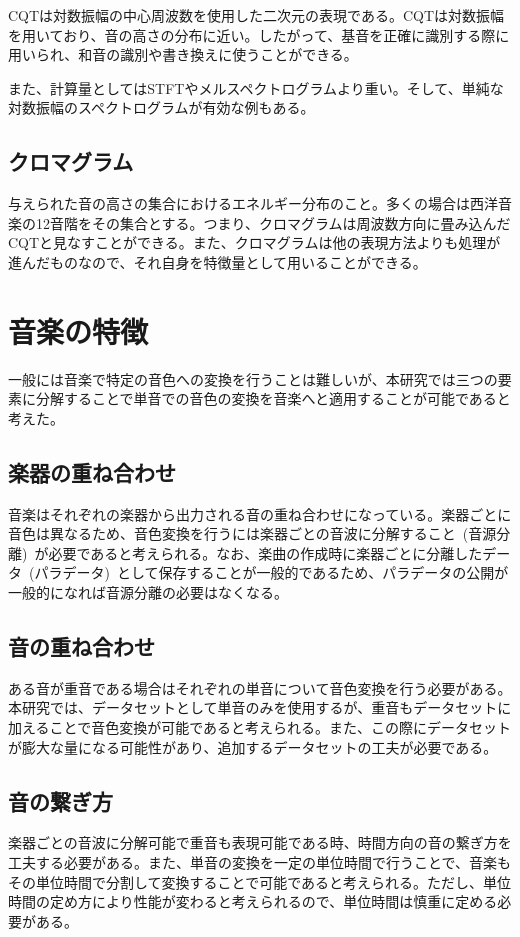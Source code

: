 CQTは対数振幅の中心周波数を使用した二次元の表現である。CQTは対数振幅を用いており、音の高さの分布に近い。したがって、基音を正確に識別する際に用いられ、和音の識別や書き換えに使うことができる。

また、計算量としてはSTFTやメルスペクトログラムより重い。そして、単純な対数振幅のスペクトログラムが有効な例もある。

\subsection{クロマグラム}

与えられた音の高さの集合におけるエネルギー分布のこと。多くの場合は西洋音楽の12音階をその集合とする。つまり、クロマグラムは周波数方向に畳み込んだCQTと見なすことができる。また、クロマグラムは他の表現方法よりも処理が進んだものなので、それ自身を特徴量として用いることができる。






\section{音楽の特徴}

一般には音楽で特定の音色への変換を行うことは難しいが、本研究では三つの要素に分解することで単音での音色の変換を音楽へと適用することが可能であると考えた。

\subsection{楽器の重ね合わせ}
    
音楽はそれぞれの楽器から出力される音の重ね合わせになっている。楽器ごとに音色は異なるため、音色変換を行うには楽器ごとの音波に分解すること~(音源分離)~が必要であると考えられる。なお、楽曲の作成時に楽器ごとに分離したデータ~(パラデータ)~として保存することが一般的であるため、パラデータの公開が一般的になれば音源分離の必要はなくなる。

\subsection{音の重ね合わせ}

ある音が重音である場合はそれぞれの単音について音色変換を行う必要がある。本研究では、データセットとして単音のみを使用するが、重音もデータセットに加えることで音色変換が可能であると考えられる。また、この際にデータセットが膨大な量になる可能性があり、追加するデータセットの工夫が必要である。

\subsection{音の繋ぎ方}

楽器ごとの音波に分解可能で重音も表現可能である時、時間方向の音の繋ぎ方を工夫する必要がある。また、単音の変換を一定の単位時間で行うことで、音楽もその単位時間で分割して変換することで可能であると考えられる。ただし、単位時間の定め方により性能が変わると考えられるので、単位時間は慎重に定める必要がある。


